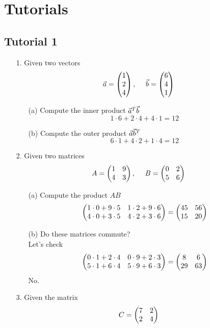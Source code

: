 \documentclass[english, 11pt]{article}
\begin{document}

   \section{Tutorials}

     \subsection{Tutorial 1}

     \begin{itemize}
       \item[1.] Given two vectors
       \[ \vec{a} = \left(\begin{matrix}1 \\ 2 \\ 4\end{matrix}\right), \ \ \ \  \vec{b} = \left(\begin{matrix}6 \\ 4 \\ 1\end{matrix}\right) \]
       \begin{itemize}
         \item[(a)] Compute the inner product $\vec{a}^T\vec{b}$ \\
           \[ 1\cdot6 + 2\cdot4 + 4\cdot 1 = 12 \]
         \item[(b)] Compute the outer product $\vec{a}\vec{b}^T$
           \[ 6 \cdot 1 + 4\cdot2 + 1\cdot4 = 12 \]
       \end{itemize}
       \item[2.] Given two matrices
       \[ A = \left(\begin{matrix}1 & 9 \\ 4 & 3\end{matrix}\right), \ \ \ \ B = \left(\begin{matrix}0 & 2 \\ 5 & 6\end{matrix}\right) \]
       \begin{itemize}
         \item[(a)] Compute the product $AB$
           \[ \left(\begin{matrix}1\cdot0 + 9\cdot5 & 1 \cdot2 + 9\cdot 6 \\ 4 \cdot 0 + 3 \cdot 5 & 4 \cdot 2 + 3 \cdot 6\end{matrix}\right) = \left(\begin{matrix}45 & 56 \\ 15 & 20\end{matrix}\right)\]
         \item[(b)] Do these matrices commute? \\
           Let's check
           \[ \left(\begin{matrix} 0 \cdot 1 + 2 \cdot 4 & 0 \cdot 9 + 2 \cdot 3 \\ 5\cdot1 + 6 \cdot 4 &  5 \cdot 9 + 6\cdot 3 \end{matrix}\right) = \left(\begin{matrix}8 & 6 \\ 29 & 63\end{matrix}\right) \]
           No.
       \end{itemize}
       \item[3.] Given the matrix
       \[ C = \left(\begin{matrix}7 & 2 \\ 2 & 4\end{matrix}\right) \]

\end{itemize}
\end{document}

